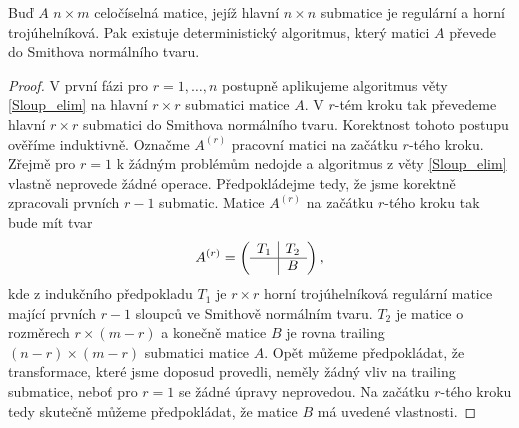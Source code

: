 \begin{vet} \label{SNF_Triang}
Buď $ A $ $ n \times m $ celočíselná matice, jejíž hlavní $ n \times n $
submatice je regulární a horní trojúhelníková. Pak existuje deterministický
algoritmus, který matici $ A $ převede do Smithova normálního tvaru.
\end{vet}
\begin{proof}
V první fázi pro $ r = 1,\dots, n $ postupně aplikujeme algoritmus věty
\ref{Sloup_elim} na hlavní $ r \times r $ submatici matice $ A $. V $ r $-tém
kroku tak převedeme hlavní $ r \times r $ submatici do Smithova normálního
tvaru. Korektnost tohoto postupu ověříme induktivně. Označme $ A^{(r)} $ pracovní
matici na začátku $ r $-tého kroku. Zřejmě pro $ r = 1 $ k žádným problémům
nedojde a algoritmus z věty \ref{Sloup_elim} vlastně neprovede žádné operace.
Předpokládejme tedy, že jsme korektně zpracovali prvních $ r - 1 $ submatic.
Matice $ A^{(r)} $ na začátku $ r $-tého kroku tak bude mít tvar
\begin{align*}
A^{(r)} =
    \left(
    \begin{array}{c|c}
        T_1 & T_2 \\ \hline
            & B   \\
    \end{array}
    \right)
,
\end{align*}
kde z indukčního předpokladu $ T_1 $ je $ r \times r $ horní trojúhelníková
regulární matice mající prvních $ r - 1 $ sloupců ve Smithově normálním tvaru.
$ T_2 $ je matice o rozměrech $ r \times (m - r) $ a konečně matice $ B $ je
rovna trailing $ (n - r) \times (m - r) $ submatici matice $ A $. Opět můžeme
předpokládat, že transformace, které jsme doposud provedli, neměly
žádný vliv na trailing submatice, neboť pro $ r = 1 $ se žádné úpravy neprovedou.
Na začátku $ r $-tého kroku tedy skutečně můžeme předpokládat, že matice $ B $
má uvedené vlastnosti.


\end{proof}
